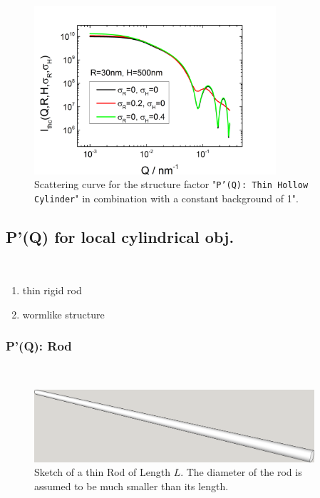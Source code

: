 \begin{figure}[htb]
\begin{center}
\includegraphics[width=0.8\textwidth,height=0.55\textwidth]{../images/form_factor/anisotropic/PprimeThinHollowCylinder.png}
\end{center}
\caption{Scattering curve for the structure factor "\texttt{P'(Q): Thin Hollow Cylinder}" in combination with a constant background of 1".}
\label{fig_IQ:PprimeThinHollowCylinder}
\end{figure}


\clearpage
\subsection{P'(Q) for local cylindrical obj.} ~\\
\label{plugin:Pprime4cylindrical}
\begin{enumerate}
\item thin rigid rod
\item wormlike structure
\end{enumerate}

\clearpage
\subsubsection{P'(Q): Rod} ~\\
\label{plugin:Pprime4rods}

\begin{figure}[htb]
\begin{center}
\includegraphics[width=0.926\textwidth,height=0.24\textwidth]{../images/form_factor/anisotropic/ThinRod.png}
\end{center}
\caption{Sketch of a thin Rod of Length $L$. The diameter of the rod is assumed to be much smaller than its length.}
\label{fig:ThinRod}
\end{figure}

